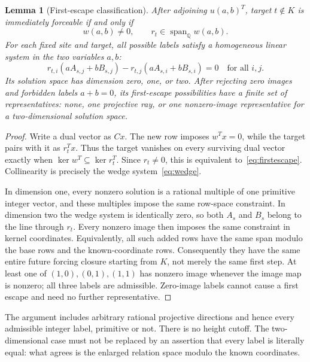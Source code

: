 \documentclass[11pt,letterpaper]{article}
\newtheorem{lemma}[theorem]{Lemma}
\theoremstyle{definition}
\theoremstyle{remark}\newtheorem{remark}[theorem]{Remark}
\newcommand{\Q}{\mathbb Q}\newcommand{\Z}{\mathbb Z}\newcommand{\R}{\mathbb R}
\begin{document}
\begin{lemma}[First-escape classification]\label{lem:firstescape}
After adjoining $u(a,b)^T$, target $t\notin K$ is immediately forceable if and only if
\begin{equation}\label{eq:firstescape}
w(a,b)\ne0,\qquad r_t\in\operatorname{span}_{\Q}w(a,b).
\end{equation}
For each fixed site and target, all possible labels satisfy a homogeneous linear system in the two variables $a,b$:
\begin{equation}\label{eq:wedge}
r_{t,i}(aA_{s,j}+bB_{s,j})-
 r_{t,j}(aA_{s,i}+bB_{s,i})=0
\quad\text{for all }i,j.
\end{equation}
Its solution space has dimension zero, one, or two. After rejecting zero images and forbidden labels $a+b=0$, its first-escape possibilities have a finite set of representatives: none, one projective ray, or one nonzero-image representative for a two-dimensional solution space.
\end{lemma}
\begin{proof}
Write a dual vector as $Cx$. The new row imposes $w^Tx=0$, while the target pairs with it as $r_t^Tx$. Thus the target vanishes on every surviving dual vector exactly when $\ker w^T\subseteq\ker r_t^T$. Since $r_t\ne0$, this is equivalent to~\eqref{eq:firstescape}. Collinearity is precisely the wedge system~\eqref{eq:wedge}.

In dimension one, every nonzero solution is a rational multiple of one primitive integer vector, and these multiples impose the same row-space constraint. In dimension two the wedge system is identically zero, so both $A_s$ and $B_s$ belong to the line through $r_t$. Every nonzero image then imposes the same constraint in kernel coordinates. Equivalently, all such added rows have the same span modulo the base rows and the known-coordinate rows. Consequently they have the same entire future forcing closure starting from $K$, not merely the same first step. At least one of $(1,0),(0,1),(1,1)$ has nonzero image whenever the image map is nonzero; all three labels are admissible. Zero-image labels cannot cause a first escape and need no further representative.
\end{proof}
The argument includes arbitrary rational projective directions and hence every admissible integer label, primitive or not. There is no height cutoff. The two-dimensional case must not be replaced by an assertion that every label is literally equal: what agrees is the enlarged relation space modulo the known coordinates.
\end{document}
